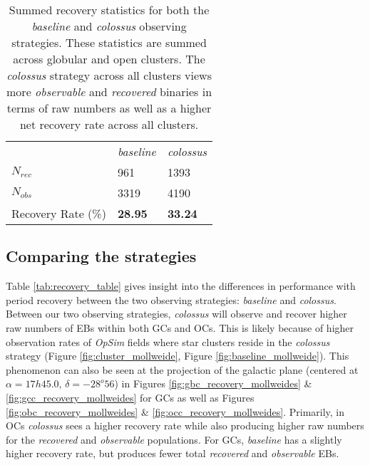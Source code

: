 \documentclass[twocolumn]{aastex63}
\begin{document}
\begin{table}
    \centering
    \begin{tabular}{lll}
     & \textit{baseline} & \textit{colossus} \\
    {$N_{rec}$}  & {961} & {1393} \\
    {$N_{obs}$}  & {3319}& {4190}  \\ \hline
    {Recovery Rate (\%)} &  \textbf{28.95} & \textbf{33.24}
    \end{tabular}
    \caption{Summed recovery statistics for both the \textit{baseline} and \textit{colossus} observing strategies. These statistics are summed across globular and open clusters. The \textit{colossus} strategy across all clusters views more \textit{observable} and \textit{recovered} binaries in terms of raw numbers as well as a higher net recovery rate across all clusters.}
    \label{tab:summed_rec_stats}
\end{table}

\subsection{Comparing the strategies}
Table \ref{tab:recovery_table} gives insight into the differences in performance with period recovery between the two observing strategies: \textit{baseline} and \textit{colossus}. Between our two observing strategies, \textit{colossus} will observe and recover higher raw numbers of EBs within both GCs and OCs. This is likely because of higher observation rates of \textit{OpSim} fields where star clusters reside in the \textit{colossus} strategy (Figure \ref{fig:cluster_mollweide}, Figure \ref{fig:baseline_mollweide}). This phenomenon can also be seen at the projection of the galactic plane (centered at $\alpha = 17h 45.0$, $\delta = -28^o 56$) in Figures \ref{fig:gbc_recovery_mollweides} \& \ref{fig:gcc_recovery_mollweides} for GCs as well as Figures \ref{fig:obc_recovery_mollweides} \& \ref{fig:occ_recovery_mollweides}. Primarily, in OCs \textit{colossus} sees a higher recovery rate while also producing higher raw numbers for the \textit{recovered} and \textit{observable} populations. For GCs, \textit{baseline} has a slightly higher recovery rate, but produces fewer total \textit{recovered} and \textit{observable} EBs. 

\end{document}
